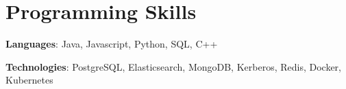 

\section{Programming Skills}\label{sec:programming-skills}
\resumeSubHeadingListStart
\item{
    \textbf{Languages}{: Java, Javascript, Python, SQL, C++}
}
\item{
    \textbf{Technologies}{: PostgreSQL, Elasticsearch, MongoDB, Kerberos, Redis, Docker, Kubernetes}
}
\resumeSubHeadingListEnd
